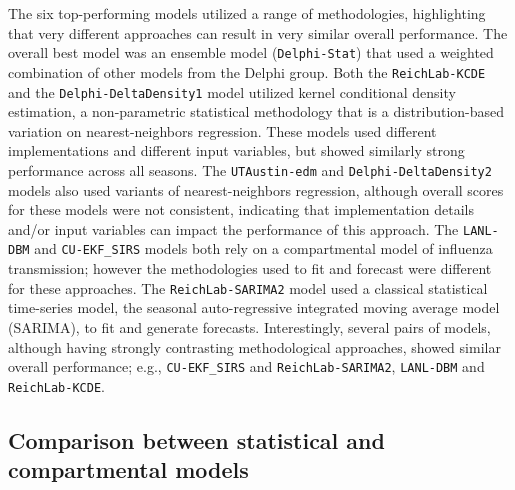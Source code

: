 \documentclass{article}\usepackage[]{graphicx}\usepackage[]{color}
\begin{document}
The six top-performing models utilized a range of methodologies, highlighting that very different approaches can result in very similar overall performance. 
The overall best model was an ensemble model ({\tt Delphi-Stat}) that used a weighted combination of other models from the Delphi group.
Both the {\tt ReichLab-KCDE} and the {\tt Delphi-DeltaDensity1} model utilized kernel conditional density estimation, a non-parametric statistical methodology that is a distribution-based variation on nearest-neighbors regression. 
These models used different implementations and different input variables, but showed similarly strong performance across all seasons.
The {\tt UTAustin-edm} and {\tt Delphi-DeltaDensity2} models also used variants of nearest-neighbors regression, although overall scores for these models were not consistent, indicating that implementation details and/or input variables can impact the performance of this approach.
The {\tt LANL-DBM} and {\tt CU-EKF\_SIRS} models both rely on a compartmental model of influenza transmission; however the methodologies used to fit and forecast were different for these approaches.
The {\tt ReichLab-SARIMA2} model used a classical statistical time-series model, the seasonal auto-regressive integrated moving average model (SARIMA), to fit and generate forecasts. 
Interestingly, several pairs of models, although having strongly contrasting methodological approaches, showed similar overall performance; e.g., {\tt CU-EKF\_SIRS} and {\tt ReichLab-SARIMA2}, {\tt LANL-DBM} and {\tt ReichLab-KCDE}.


\subsection*{Comparison between statistical and compartmental models} \label{sec:stat-mech}
\end{document}
